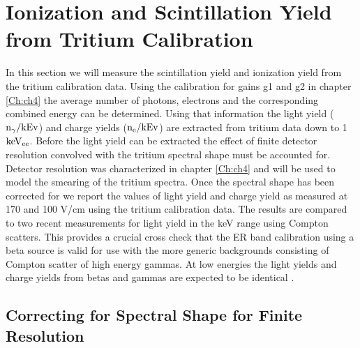 \renewcommand{\thechapter}{6}

\chapter{Ionization and Scintillation Yield from Tritium Calibration}
\label{Ch:LYQY}

In this section we will measure the scintillation yield and ionization yield from the tritium calibration data. Using the calibration for gains g1 and g2 in chapter \ref{Ch:ch4} the average number of photons, electrons and the corresponding combined energy can be determined. Using that information the light yield ($\rm n_\gamma/kEv$) and charge yields ($\rm n_e/kEv$) are extracted from tritium data down to 1 $\rm keV_{ee}$. Before the light yield can be extracted the effect of finite detector resolution convolved with the tritium spectral shape must be accounted for. Detector resolution was characterized in chapter \ref{Ch:ch4} and will be used to model the smearing of the tritium spectra. Once the spectral shape has been corrected for we report the values of light yield and charge yield as measured at 170 and 100 V/cm using the tritium calibration data. The results are compared to two recent measurements for light yield in the keV range using Compton scatters. This provides a crucial cross check that the ER band calibration using a beta source is valid for use with the more generic backgrounds consisting of Compton scatter of high energy gammas. At low energies the light yields and charge yields from betas and gammas are expected to be identical \cite{NEST} \cite{NEST_2013}.


\section{Correcting for Spectral Shape for Finite Resolution}
\label{sec:Smear}

